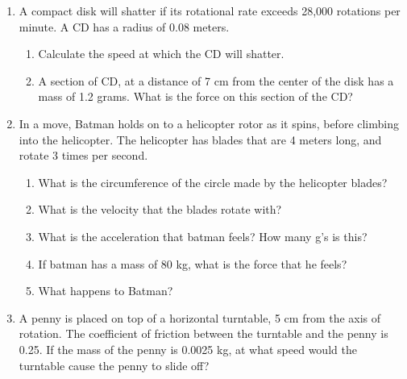\documentclass[letterpaper, 12pt]{article}
\begin{document}
\begin{enumerate}
\begin{enumerate}
		
		
		
		
		
	\end{enumerate}
	
	\item A compact disk will shatter if its rotational rate exceeds 28,000 rotations per minute.  A CD has a radius of 0.08 meters.
		\begin{enumerate}
			\item Calculate the speed at which the CD will shatter.
				\vspace{1in}
			\item A section of CD, at a distance of 7 cm from the center of the disk has a mass of 1.2 grams. What is the force on this section of the CD?
				\vspace{1in}
		\end{enumerate}
	
	\item In a move, Batman holds on to a helicopter rotor as it spins, before climbing into the helicopter. The helicopter has blades that are 4 meters long, and rotate 3 times per second.  
	\begin{enumerate}
		\item What is the circumference of the circle made by the helicopter blades?   
			\vspace{0.75in}
		\item 	What is the velocity that the blades rotate with?		
			\vspace{0.75in}
		\item What is the acceleration that batman feels?  How many g's is this?
			\vspace{0.75in}
		\item If batman has a mass of 80 kg, what is the force that he feels?
			\vspace{0.75in}
		\item What happens to Batman?	
			\vspace{0.75in}
	\end{enumerate}
	
	\item A penny is placed on top of a horizontal turntable, 5 cm from the axis of rotation.  The coefficient of friction between the turntable and the penny is 0.25.  If the mass of the penny is 0.0025 kg, at what speed would the turntable cause the penny to slide off?
	



\end{enumerate}
 
\end{document}
